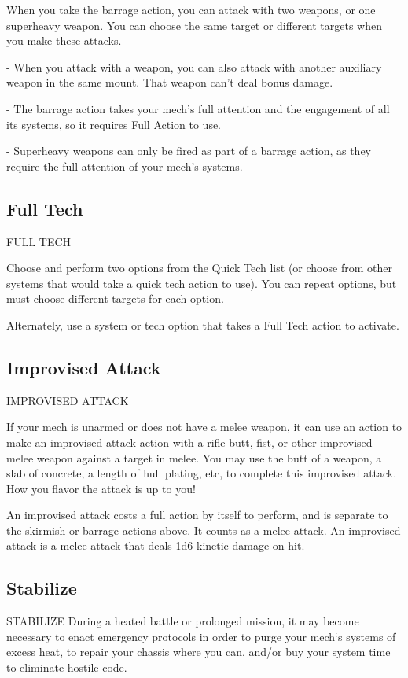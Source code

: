 When you take the barrage action, you can attack with two weapons, or one superheavy
weapon. You can choose the same target or different targets when you make these attacks.

        	- When you attack with a weapon, you can also attack with another auxiliary weapon in
        the same mount. That weapon can’t deal bonus damage.

        	- The barrage action takes your mech’s full attention and the engagement of all its
        systems, so it requires Full Action to use.

        	- Superheavy weapons can only be fired as part of a barrage action, as they require the
        full attention of your mech’s systems.
\subsection{Full Tech}
                                              FULL TECH

Choose and perform two options from the Quick Tech list (or choose from other systems that
would take a quick tech action to use). You can repeat options, but must choose different targets
for each option.


Alternately, use a system or tech option that takes a Full Tech action to activate.
 \subsection{Improvised Attack}

                                      IMPROVISED ATTACK

If your mech is unarmed or does not have a melee weapon, it can use an action to make an
improvised attack action with a rifle butt, fist, or other improvised melee weapon against a target
in melee. You may use the butt of a weapon, a slab of concrete, a length of hull plating, etc, to
complete this improvised attack. How you flavor the attack is up to you!


An improvised attack costs a full action by itself to perform, and is separate to the skirmish or
barrage actions above. It counts as a melee attack. An improvised attack is a melee attack that
deals 1d6 kinetic damage on hit.
\subsection{Stabilize}
                                              STABILIZE
During a heated battle or prolonged mission, it may become necessary to enact emergency
protocols in order to purge your mech‘s systems of excess heat, to repair your chassis where you
can, and/or buy your system time to eliminate hostile code.

